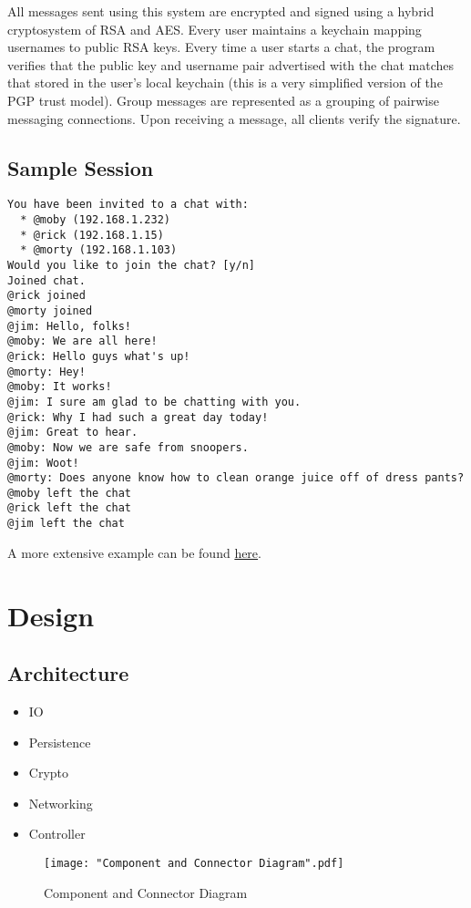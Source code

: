 \documentclass{scrartcl}
\begin{document}
All messages sent using this system are encrypted and signed using a hybrid cryptosystem of RSA and AES. Every user maintains a keychain mapping usernames to public RSA keys. Every time a user starts a chat, the program verifies that the public key and username pair advertised with the chat matches that stored in the user's local keychain (this is a very simplified version of the PGP trust model). Group messages are represented as a grouping of pairwise messaging connections. Upon receiving a message, all clients verify the signature.

\subsection{Sample Session}
\begin{lstlisting}
You have been invited to a chat with:
  * @moby (192.168.1.232)
  * @rick (192.168.1.15)
  * @morty (192.168.1.103)
Would you like to join the chat? [y/n]
Joined chat.
@rick joined
@morty joined
@jim: Hello, folks!
@moby: We are all here!
@rick: Hello guys what's up!
@morty: Hey!
@moby: It works!
@jim: I sure am glad to be chatting with you.
@rick: Why I had such a great day today!
@jim: Great to hear.
@moby: Now we are safe from snoopers.
@jim: Woot!
@morty: Does anyone know how to clean orange juice off of dress pants?
@moby left the chat
@rick left the chat
@jim left the chat
\end{lstlisting}

A more extensive example can be found  \href{https://asciinema.org/a/e9isbc0pb8ww5i36jjpck3dz6}{here}.

\section{Design}
\subsection{Architecture}
\begin{itemize}
	\item IO
	\item Persistence
	\item Crypto
	\item Networking
	\item Controller
\end{itemize}

\begin{figure}[H]
	\texttt{[image: "Component and Connector Diagram".pdf]}
	\caption{Component and Connector Diagram}
\end{figure}
\end{document}
